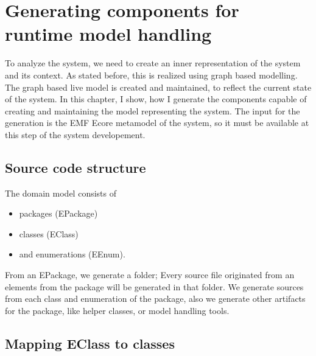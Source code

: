 \chapter{Generating components for runtime model handling}

To analyze the system, we need to create an inner representation of the system and its context. 
As stated before, this is realized using graph based modelling. 
The graph based live model is created and maintained, to reflect the current state of the system. 
In this chapter, I show, how I generate the \cpp{} components capable of creating and maintaining the model representing the system. 
The input for the generation is the EMF Ecore metamodel of the system, so it must be available at this step of the system developement. 


\section{Source code structure}

The domain model consists of 
\begin{itemize}
	\item packages (EPackage)
	\item classes (EClass) 
	\item and enumerations (EEnum).
\end{itemize}

From an EPackage, we generate a folder; Every source file originated from an elements from the package will be generated in that folder. 
We generate sources from each class and enumeration of the package, also we generate other artifacts for the package, like helper classes, or model handling tools.


\section{Mapping EClass to \protect\cpp{} classes}


